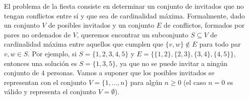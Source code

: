 
\item\label{ej:ind set} El problema de la fiesta consiste en determinar un conjunto de invitados que no tengan conflictos entre sí y que sea de cardinalidad máxima.  Formalmente, dado un conjunto $V$ de posibles invitados y un conjunto $E$ de conflictos, formados por pares no ordenados de $V$, queremos encontrar un subconjunto $S \subseteq V$ de cardinalidad máxima entre aquellos que cumplen que $\{v,w\} \not\in E$ para todo par $v,w \in S$. Por ejemplo, si $S = \{1,2,3,4,5\}$ y $E = \{ \{1,2\}, \{2, 3\}, \{3, 4\}, \{4,5\} \}$, entonces una solución es $S = \{1,3,5\}$, ya que no se puede invitar a ningún conjunto de $4$ personas.  Vamos a suponer que los posibles invitados se representan con el conjunto $V = \{1, \ldots, n\}$ para algún $n \geq 0$ (el caso $n=0$ es válido y representa el conjunto $V = \emptyset$).
\label{ejercicioFiesta}

